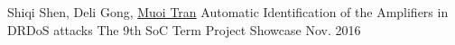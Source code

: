 

\begin{cventries}

  \cventry
    {Shiqi Shen, Deli Gong, \underline{Muoi Tran} } %
    {Automatic Identification of the Amplifiers in DRDoS attacks} %
    {The 9th SoC Term Project Showcase} %
    {Nov. 2016} %
    {
    }


\end{cventries}
